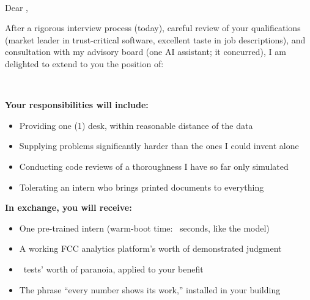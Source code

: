 \documentclass[11pt]{article}
\begin{document}

{\DisplayFont{}}\\[-1mm]
{\AccentFont\lsstyle{}}

\vspace{6mm}

Dear \TheCompany,

After a rigorous interview process (today), careful review of your qualifications
(market leader in trust-critical software, excellent taste in job descriptions),
and consultation with my advisory board (one AI assistant; it concurred), I am
delighted to extend to you the position of:

\begin{center}
{\DisplayFont{}}\\[1mm]
{\AccentFont\lsstyle{}}
\end{center}

\textbf{Your responsibilities will include:}
\begin{itemize}[leftmargin=6mm, itemsep=1.2mm]
  \item Providing one (1) desk, within reasonable distance of the data
  \item Supplying problems significantly harder than the ones I could invent alone
  \item Conducting code reviews of a thoroughness I have so far only simulated
  \item Tolerating an intern who brings printed documents to everything
\end{itemize}

\textbf{In exchange, you will receive:}
\begin{itemize}[leftmargin=6mm, itemsep=1.2mm]
  \item One pre-trained intern (warm-boot time: \StatBootSec\ seconds, like the model)
  \item A working FCC analytics platform's worth of demonstrated judgment
  \item \StatTests\ tests' worth of paranoia, applied to your benefit
  \item The phrase “every number shows its work,” installed in your building
\end{itemize}
\end{document}
